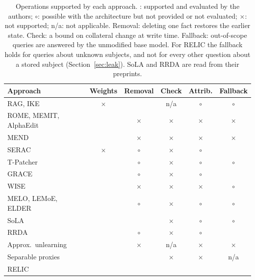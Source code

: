 \documentclass[journal,10pt]{IEEEtran}
\newcommand{\yes}{\checkmark}
\newcommand{\no}{$\times$}
\newcommand{\maybe}{$\circ$}
\begin{document}
\begin{table}[t]
\centering
\caption{Operations supported by each approach. \yes: supported and evaluated by the authors; \maybe:
possible with the architecture but not provided or not evaluated; \no: not supported; n/a: not
applicable. Removal: deleting one fact restores the earlier state. Check: a bound on collateral change at
write time. Fallback: out-of-scope queries are answered by the unmodified base model. For RELIC the
fallback holds for queries about unknown subjects, and not for every other question about a stored
subject (Section~\ref{sec:leak}). SoLA and RRDA are read from their preprints.}
\label{tab:positioning}
\footnotesize
\setlength{\tabcolsep}{2.8pt}
\begin{tabular}{lccccc}
\toprule
Approach & Weights & Removal & Check & Attrib. & Fallback \\
\midrule
RAG, IKE~\cite{lewis2020rag,zheng2023ike} & \no & \yes & n/a & \maybe & \maybe \\
ROME, MEMIT, AlphaEdit & \yes & \no & \no & \no & \no \\
MEND~\cite{mitchell2022mend} & \yes & \no & \no & \no & \no \\
SERAC~\cite{mitchell2022serac} & \no & \maybe & \no & \maybe & \yes \\
T-Patcher~\cite{huang2023tpatcher} & \yes & \maybe & \no & \maybe & \maybe \\
GRACE~\cite{hartvigsen2023grace} & \yes & \maybe & \no & \maybe & \yes \\
WISE~\cite{wang2024wise} & \yes & \no & \no & \no & \maybe \\
MELO, LEMoE, ELDER & \yes & \maybe & \no & \maybe & \maybe \\
SoLA~\cite{luo2026sola} & \yes & \yes & \no & \maybe & \maybe \\
RRDA~\cite{zhang2026rrda} & \yes & \maybe & \no & \maybe & \yes \\
Approx.\ unlearning~\cite{eldan2023harrypotter} & \yes & \no & n/a & \no & \no \\
Separable proxies~\cite{schneider2026separable} & \yes & \yes & \no & \no & n/a \\
\midrule
RELIC & \yes & \yes & \yes & \yes & \yes \\
\bottomrule
\end{tabular}
\end{table}
\end{document}
